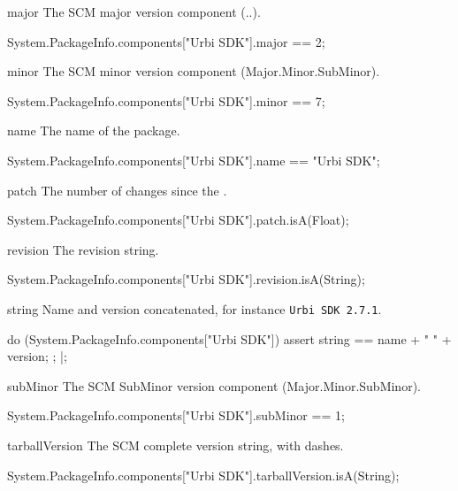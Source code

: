 \begin{urbiscriptapi}
\item[major] The SCM major version component
  (..).
\begin{urbiassert}
System.PackageInfo.components["Urbi SDK"].major
  == 2;
\end{urbiassert}

\item[minor] The SCM minor version component (Major.Minor.SubMinor).
\begin{urbiassert}
System.PackageInfo.components["Urbi SDK"].minor
  == 7;
\end{urbiassert}

\item[name] The name of the package.
\begin{urbiassert}
System.PackageInfo.components["Urbi SDK"].name
  == "Urbi SDK";
\end{urbiassert}

\item[patch] The number of changes since the .
\begin{urbiassert}
System.PackageInfo.components["Urbi SDK"].patch.isA(Float);
\end{urbiassert}

\item[revision] The revision string.
\begin{urbiassert}
System.PackageInfo.components["Urbi SDK"].revision.isA(String);
\end{urbiassert}

\item[string] Name and version concatenated, for instance
  \lstinline|Urbi SDK 2.7.1|.
\begin{urbiscript}
do (System.PackageInfo.components["Urbi SDK"])
{
  assert
  {
    string == name + " " + version;
  };
}|;
\end{urbiscript}

\item[subMinor] The SCM SubMinor version component (Major.Minor.SubMinor).
\begin{urbiassert}
System.PackageInfo.components["Urbi SDK"].subMinor
  == 1;
\end{urbiassert}

\item[tarballVersion] The SCM complete version string, with dashes.
\begin{urbiassert}
System.PackageInfo.components["Urbi SDK"].tarballVersion.isA(String);
\end{urbiassert}


\end{urbiscriptapi}
